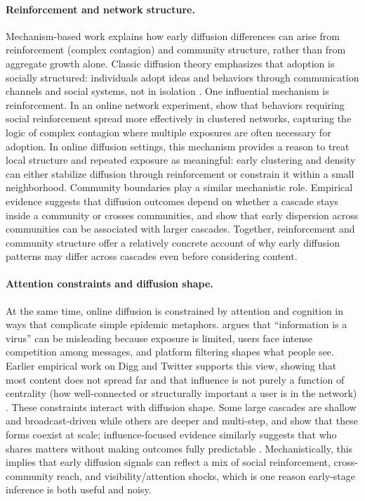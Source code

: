\paragraph{Reinforcement and network structure.}
Mechanism-based work explains how early diffusion differences can arise from reinforcement (complex contagion) and community structure, rather than from aggregate growth alone. Classic diffusion theory emphasizes that adoption is socially structured: individuals adopt ideas and behaviors through communication channels and social systems, not in isolation \citep{rogers_diffusion_2003}. One influential mechanism is reinforcement. In an online network experiment, \citet{centola_spread_2010} show that behaviors requiring social reinforcement spread more effectively in clustered networks, capturing the logic of complex contagion where multiple exposures are often necessary for adoption. In online diffusion settings, this mechanism provides a reason to treat local structure and repeated exposure as meaningful: early clustering and density can either stabilize diffusion through reinforcement or constrain it within a small neighborhood. Community boundaries play a similar mechanistic role. Empirical evidence suggests that diffusion outcomes depend on whether a cascade stays inside a community or crosses communities, and \citet{weng_virality_2013} show that early dispersion across communities can be associated with larger cascades. Together, reinforcement and community structure offer a relatively concrete account of why early diffusion patterns may differ across cascades even before considering content.

\paragraph{Attention constraints and diffusion shape.}
At the same time, online diffusion is constrained by attention and cognition in ways that complicate simple epidemic metaphors. \citet{lerman_information_2016} argues that ``information is a virus'' can be misleading because exposure is limited, users face intense competition among messages, and platform filtering shapes what people see. Earlier empirical work on Digg and Twitter supports this view, showing that most content does not spread far and that influence is not purely a function of centrality (how well-connected or structurally important a user is in the network) \citep{lerman_information_2010}. These constraints interact with diffusion shape. Some large cascades are shallow and broadcast-driven while others are deeper and multi-step, and \citet{goel_structural_2016} show that these forms coexist at scale; influence-focused evidence similarly suggests that who shares matters without making outcomes fully predictable \citep{bakshy_everyones_2011}. Mechanistically, this implies that early diffusion signals can reflect a mix of social reinforcement, cross-community reach, and visibility/attention shocks, which is one reason early-stage inference is both useful and noisy.

